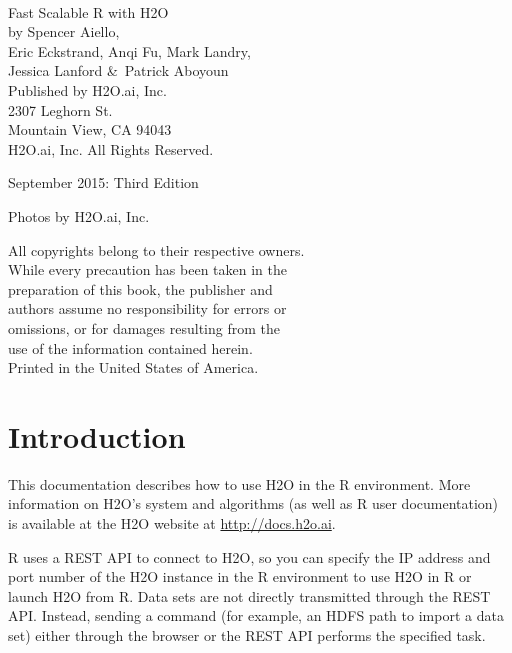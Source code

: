 {\raggedright\vfill\ 

Fast Scalable R with H2O\\

  by Spencer Aiello,\\ Eric Eckstrand, Anqi Fu, Mark Landry, \\ Jessica Lanford  \&\ Patrick Aboyoun\\
\bigskip
  Published by H2O.ai, Inc. \\
2307 Leghorn St. \\
Mountain View, CA 94043\\
\bigskip
\textcopyright \the\year \hspace{1pt} H2O.ai, Inc. All Rights Reserved. 
\bigskip

September 2015: Third Edition
\bigskip

Photos by \textcopyright H2O.ai, Inc. 
\bigskip

All copyrights belong to their respective owners.\\
While every precaution has been taken in the\\
preparation of this book, the publisher and\\
authors assume no responsibility for errors or\\
omissions, or for damages resulting from the\\
use of the information contained herein.\\
\bigskip
Printed in the United States of America. 




\newpage
\thispagestyle{empty}%
\tableofcontents
\thispagestyle{empty}%


\newpage


\section{Introduction}

This documentation describes how to use H2O in the R environment. More information on H2O's system and algorithms (as well as R user documentation) is available at the H2O website at {\url{http://docs.h2o.ai}}. 

R uses a REST API to connect to H2O, so you can specify the IP address and port number of the H2O instance in the R environment to use H2O in R or launch H2O from R. Data sets are not directly transmitted through the REST API. Instead, sending a command (for example, an HDFS path to import a data set) either through the browser or the REST API performs the specified task.

}
